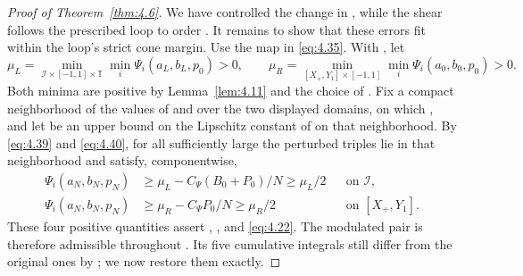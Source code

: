 \begin{proof}[Proof of Theorem~\ref{thm:4.6}]
We have controlled the change in , while the shear follows the
prescribed loop to order . It remains to show that these errors fit
within the loop's strict cone margin. Use the map  in
\eqref{eq:4.35}. With , let
\[
\mu_L=\min_{\mathcal I\times[-1,1]\times\mathbb T}\min_i
\Psi_i(a_L,b_L,p_0)>0,
\qquad
\mu_R=\min_{[X_+,Y_1]\times[-1,1]}\min_i
\Psi_i(a_0,b_0,p_0)>0.
\]
Both minima are positive by Lemma~\ref{lem:4.11} and the choice of
. Fix a compact neighborhood of the values of
 and  over the two
displayed domains, on which , and let
 be an upper bound on the Lipschitz constant of
 on that neighborhood. By \eqref{eq:4.39} and \eqref{eq:4.40}, for
all sufficiently large  the perturbed triples lie in that neighborhood and
satisfy, componentwise,
\begin{equation}
\begin{aligned}
\Psi_i(a_N,b_N,p_N)&\ge\mu_L-C_\Psi(B_0+P_0)/N\ge\mu_L/2
&&\text{on }\mathcal I,\\
\Psi_i(a_N,b_N,p_N)&\ge\mu_R-C_\Psi P_0/N\ge\mu_R/2
&&\text{on }[X_+,Y_1].
\end{aligned}
\tag{4.41}\label{eq:4.41}
\end{equation}
These four positive quantities assert ,
, and \eqref{eq:4.22}. The modulated pair is therefore admissible
throughout . Its five cumulative integrals still differ from the
original ones by ; we now restore them exactly.


\end{proof}
